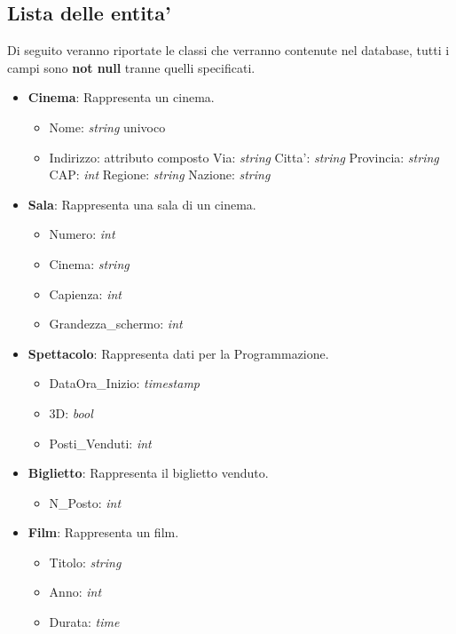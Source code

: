 \documentclass[10pt]{article}
\begin{document}
	\subsection{Lista delle entita'}
	Di seguito veranno riportate le classi che verranno contenute nel database, tutti i campi sono \textbf{not null} tranne quelli specificati.\\
	\begin{itemize}
		\item \textbf{Cinema}: Rappresenta un cinema.
		\begin{itemize}
			\item Nome: \textit{string} univoco
			\item Indirizzo: attributo composto
				\subitem Via: \textit{string}
				\subitem Citta': \textit{string}
				\subitem Provincia: \textit{string}
				\subitem CAP: \textit{int}
				\subitem Regione: \textit{string}
				\subitem Nazione: \textit{string}			
		\end{itemize}
		\item \textbf{Sala}: Rappresenta una sala di un cinema.
		\begin{itemize}
		    \item Numero: \textit{int}
		    \item Cinema: \textit{string}
			\item Capienza: \textit{int}
			\item Grandezza\_schermo: \textit{int}
		\end{itemize}
		\item \textbf{Spettacolo}: Rappresenta dati per la Programmazione.
		\begin{itemize}
			\item DataOra\_Inizio: \textit{timestamp}
			\item 3D: \textit{bool}
			\item Posti\_Venduti: \textit{int}
		\end{itemize}
		\item \textbf{Biglietto}: Rappresenta il biglietto venduto.
		\begin{itemize}
			\item N\_Posto: \textit{int}
		\end{itemize}
		\item \textbf{Film}: Rappresenta un film.
		\begin{itemize}
			\item Titolo: \textit{string}
			\item Anno: \textit{int}
			\item Durata: \textit{time}

\end{itemize}
\end{itemize}
\end{document}
